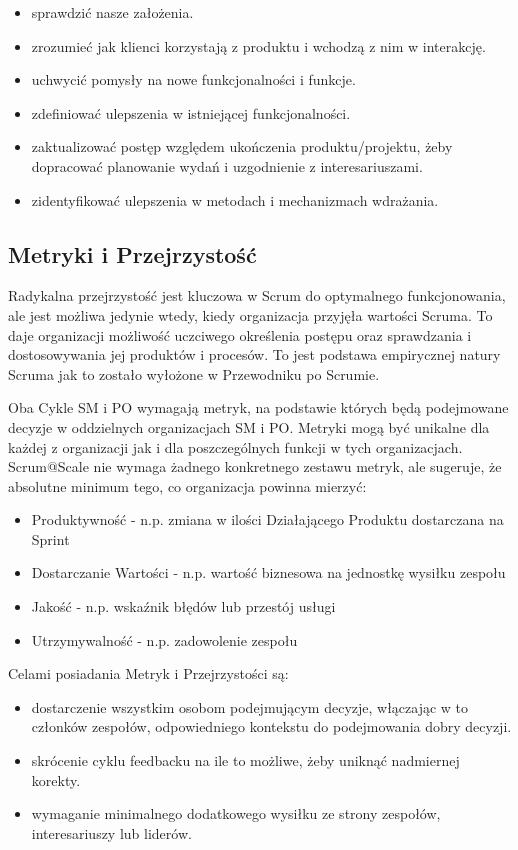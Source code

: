 \documentclass[12pt,a4paper,parskip=full]{scrartcl}
\begin{document}
\begin{itemize}
	\item sprawdzić nasze założenia.
	\item zrozumieć jak klienci korzystają z produktu i wchodzą z nim w interakcję.
	\item uchwycić pomysły na nowe funkcjonalności i funkcje.
	\item zdefiniować ulepszenia w istniejącej funkcjonalności.
	\item zaktualizować postęp względem ukończenia produktu/projektu, żeby dopracować planowanie wydań i uzgodnienie z interesariuszami.
	\item zidentyfikować ulepszenia w metodach i mechanizmach wdrażania.
\end{itemize}

\subsection{Metryki i Przejrzystość}

Radykalna przejrzystość jest kluczowa w Scrum do optymalnego funkcjonowania, ale jest możliwa jedynie wtedy, kiedy organizacja przyjęła wartości Scruma. To daje organizacji możliwość uczciwego określenia postępu oraz sprawdzania i dostosowywania jej produktów i procesów. To jest podstawa empirycznej natury Scruma jak to zostało wyłożone w Przewodniku po Scrumie.

Oba Cykle SM i PO wymagają metryk, na podstawie których będą podejmowane decyzje w oddzielnych organizacjach SM i PO. Metryki mogą być unikalne dla każdej z organizacji jak i dla poszczególnych funkcji w tych organizacjach. Scrum@Scale nie wymaga żadnego konkretnego zestawu metryk, ale sugeruje, że absolutne minimum tego, co organizacja powinna mierzyć:

\begin{itemize}
	\item Produktywność - n.p. zmiana w ilości Działającego Produktu dostarczana na Sprint
	\item Dostarczanie Wartości - n.p. wartość biznesowa na jednostkę wysiłku zespołu
	\item Jakość - n.p. wskaźnik błędów lub przestój usługi
	\item Utrzymywalność - n.p. zadowolenie zespołu
\end{itemize}

Celami posiadania Metryk i Przejrzystości są:

\begin{itemize}
	\item dostarczenie wszystkim osobom podejmującym decyzje, włączając w to członków zespołów, odpowiedniego kontekstu do podejmowania dobry decyzji.
	\item skrócenie cyklu feedbacku na ile to możliwe, żeby uniknąć nadmiernej korekty.
	\item wymaganie minimalnego dodatkowego wysiłku ze strony zespołów, interesariuszy lub liderów.
\end{itemize}
\end{document}
